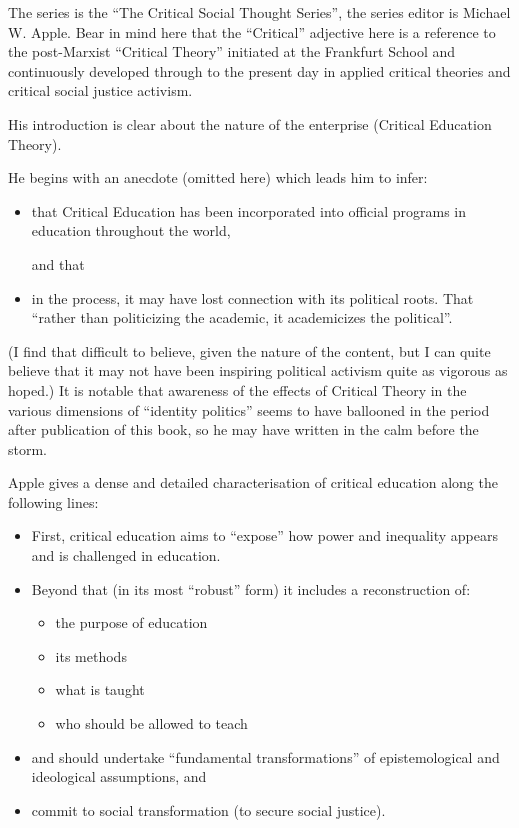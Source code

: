 \documentclass[10pt,titlepage]{book}
\begin{document}
The series is the ``The Critical Social Thought Series'', the series editor is Michael W. Apple.
Bear in mind here that the ``Critical'' adjective here is a reference to the post-Marxist ``Critical Theory'' initiated at the Frankfurt School and continuously developed through to the present day in applied critical theories and critical social justice activism.

His introduction is clear about the nature of the enterprise (Critical Education Theory).

He begins with an anecdote (omitted here) which leads him to infer:

\begin{itemize}
\item that Critical Education has been incorporated into official programs in education throughout the world,

  and that
  
\item in the process, it may have lost connection with its political roots. That ``rather than politicizing the academic, it academicizes the political''.
\end{itemize}

(I find that difficult to believe, given the nature of the content, but I can quite believe that it may not have been inspiring political activism quite as vigorous as hoped.)
It is notable that awareness of the effects of Critical Theory in the various dimensions of ``identity politics'' seems to have ballooned in the period after publication of this book, so he may have written in the calm before the storm.

Apple gives a dense and detailed characterisation of critical education along the following lines:

\begin{itemize}
\item First, critical education aims to ``expose'' how power and inequality appears and is challenged in education.
\item Beyond that (in its most ``robust'' form) it includes a reconstruction of:
  \begin{itemize}
  \item the purpose of education
  \item its methods
  \item what is taught
  \item who should be allowed to teach
  \end{itemize}
\item and should undertake ``fundamental transformations'' of epistemological and ideological assumptions, and
  \item commit to social transformation (to secure social justice).
\end{itemize}
\end{document}
